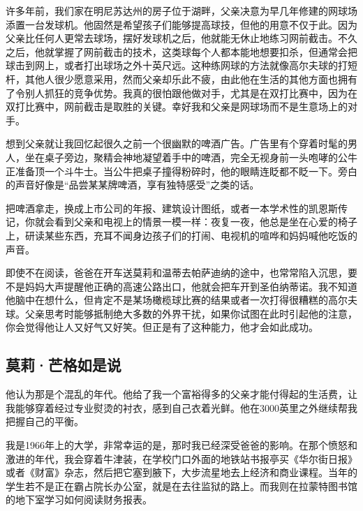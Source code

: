 许多年前，我们家在明尼苏达州的房子位于湖畔，父亲决意为早几年修建的网球场添置一台发球机。他固然是希望孩子们能够提高球技，但他的用意不仅于此。因为父亲比任何人更常去球场，摆好发球机之后，他就能无休止地练习网前截击。不久之后，他就掌握了网前截击的技术，这类球每个人都本能地想要扣杀，但通常会把球击到网上，或者打出球场之外十英尺远。这种练网球的方法就像高尔夫球的打短杆，其他人很少愿意采用，然而父亲却乐此不疲，由此他在生活的其他方面也拥有了令别人抓狂的竞争优势。我真的很怕跟他做对手，尤其是在双打比赛中，因为在双打比赛中，网前截击是取胜的关键。幸好我和父亲是网球场而不是生意场上的对手。
\par

想到父亲就让我回忆起很久之前一个很幽默的啤酒广告。广告里有个穿着时髦的男人，坐在桌子旁边，聚精会神地凝望着手中的啤酒，完全无视身前一头咆哮的公牛正准备顶一个斗牛士。当公牛把桌子撞得粉碎时，他的眼睛连眨都不眨一下。旁白的声音好像是“品尝某某牌啤酒，享有独特感受”之类的话。
\par

把啤酒拿走，换成上市公司的年报、建筑设计图纸，或者一本学术性的凯恩斯传记，你就会看到父亲和电视上的情景一模一样：夜复一夜，他总是坐在心爱的椅子上，研读某些东西，充耳不闻身边孩子们的打闹、电视机的喧哗和妈妈喊他吃饭的声音。
\par

即使不在阅读，爸爸在开车送莫莉和温蒂去帕萨迪纳的途中，也常常陷入沉思，要不是妈妈大声提醒他正确的高速公路出口，他就会把车开到圣伯纳蒂诺。我不知道他脑中在想什么，但肯定不是某场橄榄球比赛的结果或者一次打得很糟糕的高尔夫球。父亲思考时能够抵制绝大多数的外界干扰，如果你试图在此时引起他的注意，你会觉得他让人又好气又好笑。但正是有了这种能力，他才会如此成功。
\par

\subsection*{莫莉·芒格如是说}

\begin{WisdomBox}
\par

他认为那是个混乱的年代。他给了我一个富裕得多的父亲才能付得起的生活费，让我能够穿着经过专业熨烫的衬衣，感到自己衣着光鲜。他在3000英里之外继续帮我把握自己的平衡。
\par
\end{WisdomBox}

我是1966年上的大学，非常幸运的是，那时我已经深受爸爸的影响。在那个愤怒和激进的年代，我会穿着牛津装，在学校门口外面的地铁站书报亭买《华尔街日报》或者《财富》杂志，然后把它塞到腋下，大步流星地去上经济和商业课程。当年的学生若不是正在霸占院长办公室，就是在去往监狱的路上。而我则在拉蒙特图书馆的地下室学习如何阅读财务报表。
\par


